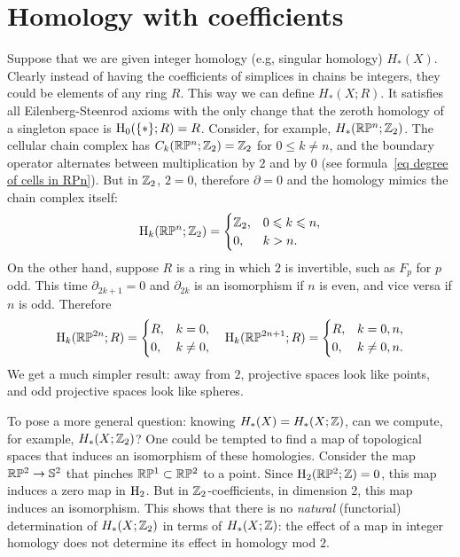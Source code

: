 




\section{Homology with coefficients}

Suppose that we are given integer homology (e.g, singular homology) $H_\ast(X)$. Clearly instead of having the coefficients of simplices in chains be integers, they could be elements of any ring $R$. This way we can define $H_\ast(X;R)$. It satisfies all Eilenberg-Steenrod axioms with the only change that the zeroth homology of a singleton space is $\mathrm{H}_0(\{\ast\};R)=R$. Consider, for example, $H_\ast(\mathbb{R}\mathbb{P}^n;\mathbb{Z}_2)$. The cellular chain complex has $C_k(\mathbb{R}\mathbb{P}^n;\mathbb{Z}_2)=\mathbb{Z}_2$ for $0\leq k\neq n$, and the boundary operator alternates between multiplication by $2$ and by $0$ (see formula~\ref{eq degree of cells in RPn}). But in $\mathbb{Z}_2$, $2=0$, therefore $\partial=0$ and the homology mimics the chain complex itself:
\[\mathrm{H}_k(\mathbb{R}\mathbb{P}^n;\mathbb{Z}_2)=\begin{cases}
    \mathbb{Z}_2,& 0\leqslant k\leqslant n,\\
    0, & k>n.
\end{cases}\]
On the other hand, suppose $R$ is a ring in which $2$ is invertible, such as $F_p$ for $p$ odd. This time $\partial_{2k+1}=0$ and $\partial_{2k}$ is an isomorphism if $n$ is even, and vice versa if $n$ is odd. Therefore 
\[\mathrm{H}_k(\mathbb{R}\mathbb{P}^{2n};R)=\begin{cases}
    R,&k=0,\\
    0,&k\neq 0,
\end{cases}\quad
\mathrm{H}_k(\mathbb{R}\mathbb{P}^{2n+1};R)=\begin{cases}
    R,&k=0,n,\\
    0,&k\neq 0,n.
\end{cases}
\]
We get a much simpler result: away from $2$, projective spaces look like points, and odd projective spaces look like spheres.

To pose a more general question: knowing $H_\ast(X)=H_\ast(X;\mathbb{Z})$, can we compute, for example, $H_\ast(X;\mathbb{Z}_2)$? One could be tempted to find a map of topological spaces that induces an isomorphism of these homologies. Consider the map $\mathbb{R}\mathbb{P}^2\to \mathbb{S}^2$ that pinches $\mathbb{R}\mathbb{P}^1\subset \mathbb{R}\mathbb{P}^2$ to a point. Since $\mathrm{H}_2(\mathbb{R}\mathbb{P}^2;\mathbb{Z})=0$, this map induces a zero map in $\mathrm{H}_2$. But in $\mathbb{Z}_2$-coefficients, in dimension 2, this map induces an isomorphism. This shows that there is no \emph{natural} (functorial) determination of $H_\ast(X;\mathbb{Z}_2)$ in terms of $H_\ast(X;\mathbb{Z})$: the effect of a map in integer homology does not determine its effect in homology mod $2$. 

